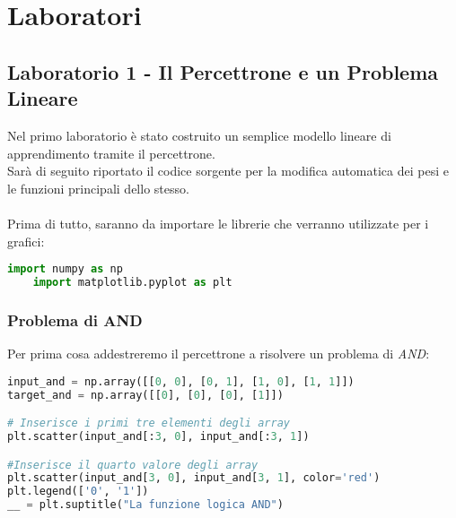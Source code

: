 \section{Laboratori}
\subsection{Laboratorio 1 - Il Percettrone e un Problema Lineare}
Nel primo laboratorio è stato costruito un semplice modello lineare di apprendimento tramite il percettrone.\\
Sarà di seguito riportato il codice sorgente per la modifica automatica dei pesi e le funzioni principali dello stesso.\\
\\
Prima di tutto, saranno da importare le librerie che verranno utilizzate per i grafici:
\begin{lstlisting}[language=Python, caption=Importazione delle librerie]
    import numpy as np
    import matplotlib.pyplot as plt
\end{lstlisting}

\subsubsection{Problema di AND}
Per prima cosa addestreremo il percettrone a risolvere un problema di \textit{AND}:
\begin{lstlisting}[language=Python, caption=Inizializzazione]
input_and = np.array([[0, 0], [0, 1], [1, 0], [1, 1]])
target_and = np.array([[0], [0], [0], [1]])

# Inserisce i primi tre elementi degli array
plt.scatter(input_and[:3, 0], input_and[:3, 1]) 

#Inserisce il quarto valore degli array
plt.scatter(input_and[3, 0], input_and[3, 1], color='red')
plt.legend(['0', '1'])
__ = plt.suptitle("La funzione logica AND")
\end{lstlisting}

